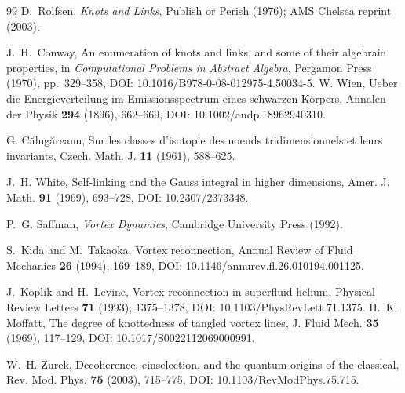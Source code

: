 \documentclass[11pt]{article}
\theoremstyle{definition}
\theoremstyle{plain}
\theoremstyle{remark}
\begin{document}
\begin{thebibliography}{99}
            D.~Rolfsen,
            \newblock \emph{Knots and Links},
            \newblock Publish or Perish (1976); AMS Chelsea reprint (2003).

            J.~H.~Conway,
            \newblock An enumeration of knots and links, and some of their algebraic properties,
            \newblock in \emph{Computational Problems in Abstract Algebra}, Pergamon Press (1970), pp.~329--358,
            \newblock DOI: 10.1016/B978-0-08-012975-4.50034-5.
            W. Wien,
            \newblock Ueber die Energieverteilung im Emissionsspectrum eines schwarzen K\"orpers,
            \newblock Annalen der Physik \textbf{294} (1896), 662--669,
            \newblock DOI: 10.1002/andp.18962940310.

            G. C\u{a}lug\u{a}reanu,
            \newblock Sur les classes d'isotopie des noeuds tridimensionnels et leurs invariants,
            \newblock Czech. Math. J. \textbf{11} (1961), 588--625.

            J.~H. White,
            \newblock Self-linking and the Gauss integral in higher dimensions,
            \newblock Amer. J. Math. \textbf{91} (1969), 693--728,
            \newblock DOI: 10.2307/2373348.

            P.~G. Saffman,
            \newblock \emph{Vortex Dynamics},
            \newblock Cambridge University Press (1992).


            S.~Kida and M.~Takaoka,
            \newblock Vortex reconnection,
            \newblock Annual Review of Fluid Mechanics \textbf{26} (1994), 169--189,
            \newblock DOI: 10.1146/annurev.fl.26.010194.001125.

            J.~Koplik and H.~Levine,
            \newblock Vortex reconnection in superfluid helium,
            \newblock Physical Review Letters \textbf{71} (1993), 1375--1378,
            \newblock DOI: 10.1103/PhysRevLett.71.1375.
            H.~K. Moffatt,
            \newblock The degree of knottedness of tangled vortex lines,
            \newblock J. Fluid Mech. \textbf{35} (1969), 117--129,
            \newblock DOI: 10.1017/S0022112069000991.

            W.~H. Zurek,
            \newblock Decoherence, einselection, and the quantum origins of the classical,
            \newblock Rev. Mod. Phys. \textbf{75} (2003), 715--775,
            \newblock DOI: 10.1103/RevModPhys.75.715.


\end{thebibliography}
\end{document}
